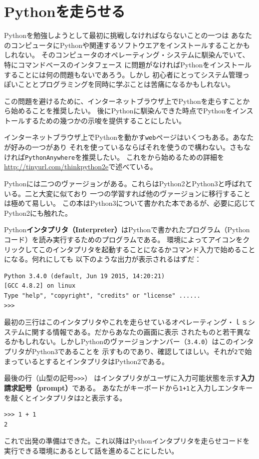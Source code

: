 \documentclass[a4j,12pt,makeidx]{jbook}
\begin{document}
\section{Pythonを走らせる}
Pythonを勉強しようとして最初に挑戦しなければならないことの一つは
あなたのコンピュータにPythonや関連するソフトウエアをインストールすることかもしれない。
そのコンピュータのオペレーティング・システムに馴染んでいて、特にコマンドベースのインタフェース
に問題がなければPythonをインストールすることには何の問題もないであろう。しかし
初心者にとってシステム管理っぽいこととプログラミングを同時に学ぶことは苦痛になるかもしれない。\par
{}
この問題を避けるために、インターネットブラウザ上でPythonを走らすことから始めることを推奨したい。
後にPythonに馴染んできた時点でPythonをインストールするための幾つかの示唆を提供することにしたい。\par
インターネットブラウザ上でPythonを動かす{\tt web}ページはいくつもある。あなたが好みの一つがあり
それを使っているならばそれを使うので構わない。さもなければ{\tt PythonAnywhere}を推奨したい。
これをから始めるための詳細を\url{http://tinyurl.com/thinkpython2e}で述べている。\par
{}
Pythonには二つのヴァージョンがある。これらはPython2とPython3と呼ばれている。二と大変に似ており
一つの学習すれば他のヴァージョンに移行することは極めて易しい。
この本はPython3について書かれた本であるが、必要に応じてPython2にも触れた。\par
{}
Python{\bf インタプリタ（Interpreter）}はPythonで書かれたプログラム（Pythonコード）を読み実行するためのプログラムである。
環境によってアイコンをクリックしてこのインタプリタを起動することになるかコマンド入力で始めることになる。何れにしても
以下のような出力が表示されるはずだ：
\begin{verbatim}
Python 3.4.0 (default, Jun 19 2015, 14:20:21) 
[GCC 4.8.2] on linux
Type "help", "copyright", "credits" or "license" ......
>>> 
\end{verbatim}
%
最初の三行はこのインタプリタやこれを走らせているオペレーティング・ｌｓシステムに関する情報である。だからあなたの画面に表示
されたものと若干異なるかもしれない。しかしPythonのヴァージョンナンバー（{\tt 3.4.0}）はこのインタプリタがPython3であることを
示すものであり、確認してほしい。それが{\tt 2}で始まっているとするとインタプリタはPython2である。\par
最後の行（山型の記号{\verb">>>"}） はインタプリタがユーザに入力可能状態を示す{\bf 入力請求記号（prompt）}である。
あなたがキーボードから{\tt 1+1}と入力しエンタキーを敲くとインタプリタは{\tt 2}と表示する。
\begin{verbatim}
>>> 1 + 1
2
\end{verbatim}
これで出発の準備はできた。これ以降はPythonインタプリタを走らせコードを実行できる環境にあるとして話を進めることにしたい。
%
\end{document}
